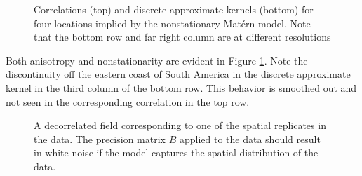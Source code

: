 \documentclass[review]{elsarticle}
\begin{document}
\begin{figure}
    \centering
    \caption{Correlations (top) and discrete approximate kernels (bottom) for four locations implied by the nonstationary Mat\'ern model. Note that the bottom row and far right column are at different resolutions}
    \label{f:5}
\end{figure}

Both anisotropy and nonstationarity are evident in Figure \ref{f:5}. Note the discontinuity off the eastern coast of South America in the discrete approximate kernel in the third column of the bottom row. This behavior is smoothed out and not seen in the corresponding correlation in the top row.


\begin{figure}
    \centering
    \caption{A decorrelated field corresponding to one of the spatial replicates in the data. The precision matrix $B$ applied to the data should result in white noise if the model captures the spatial distribution of the data.}
    \label{f:6}
\end{figure}
\end{document}
